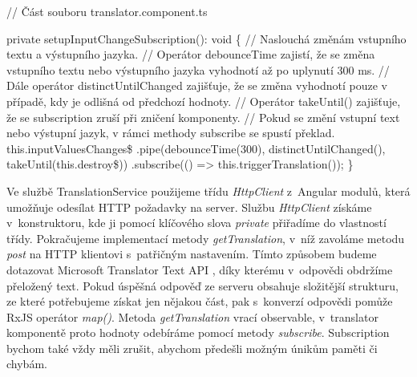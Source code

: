 \begin{prog}
// Část souboru translator.component.ts

private setupInputChangeSubscription(): void \{
  // Naslouchá změnám vstupního textu a výstupního jazyka.
  // Operátor debounceTime zajistí, že se změna vstupního textu 
    nebo výstupního jazyka vyhodnotí až po uplynutí 300 ms.
  // Dále operátor distinctUntilChanged zajišťuje, 
    že se změna vyhodnotí pouze v případě, kdy je odlišná od předchozí hodnoty.
  // Operátor takeUntil() zajišťuje, 
    že se subscription zruší při zničení komponenty.
  // Pokud se změní vstupní text nebo výstupní jazyk, 
    v rámci methody subscribe se spustí překlad.
  this.inputValuesChanges\$
    .pipe(debounceTime(300), distinctUntilChanged(), takeUntil(this.destroy\$))
    .subscribe(() => this.triggerTranslation());
\}
\end{prog}

Ve službě TranslationService použijeme třídu \emph{HttpClient} z~Angular modulů, která umožňuje odesílat HTTP požadavky na server.
Službu \emph{HttpClient} získáme v~konstruktoru, kde ji pomocí klíčového slova \emph{private} přiřadíme do vlastností třídy. 
Pokračujeme implementací metody \emph{getTranslation}, v~níž zavoláme metodu \emph{post} na HTTP klientovi s~patřičným nastavením. 
Tímto způsobem budeme dotazovat Microsoft Translator Text API \cite{translatortextapi}, díky kterému v~odpovědi obdržíme přeložený text. 
Pokud úspěšná odpověď ze serveru obsahuje složitější strukturu, ze které potřebujeme získat jen nějakou část, pak s~konverzí odpovědi pomůže RxJS operátor \emph{map()}. 
Metoda \emph{getTranslation} vrací observable, v~translator komponentě proto hodnoty odebíráme pomocí metody \emph{subscribe}. 
Subscription bychom také vždy měli zrušit, abychom předešli možným únikům paměti či chybám.

